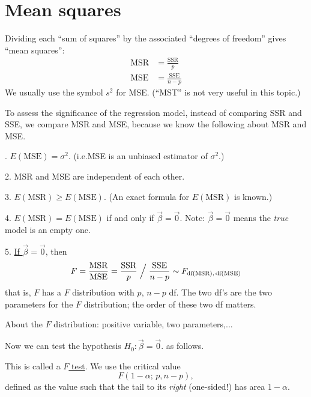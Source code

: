 \documentclass[12pt]{article}
\newcommand\SSE{\text{SSE}}
\newcommand\SSR{\text{SSR}}
\begin{document}
\section{Mean squares}

Dividing each ``sum of squares'' by the associated
``degrees of freedom'' gives ``mean squares'':
\[\begin{split}
\text{MSR} &= \frac{\text{SSR}}{p}
\\
\text{MSE} &= \frac{\text{SSE}}{n - p}
\end{split}\]
We usually use the symbol $s^2$ for MSE.
(``MST'' is not very useful in this topic.)

To assess the significance of the regression model,
instead of comparing SSR and SSE,
we compare MSR and MSE,
because we know the following about MSR and MSE.

. $E(\text{MSE}) = \sigma^2$.
(i.e.\@ MSE is an unbiased estimator of $\sigma^2$.)
\par
2. MSR and MSE are independent of each other.
\par
3. $E(\text{MSR}) \ge E(\text{MSE})$.
(An exact formula for $E(\text{MSR})$ is known.)
\par
4. $E(\text{MSR}) = E(\text{MSE})$
if and only if $\vec{\beta} = \vec{0}$.
Note: $\vec\beta = \vec{0}$ means the \emph{true} model is an empty one.
\par
5. \underline{If $\vec{\beta} = \vec{0}$}, then
\[
F = \frac{\text{MSR}}{\text{MSE}}
  = \frac{\SSR}{p} \Bigm/ \frac{\SSE}{n-p}
  \sim F_{\text{df}(\text{MSR}),\,
          \text{df}(\text{MSE})}
\]
that is,
$F$ has a $F$ distribution with
$p$, $n-p$ df.
The two df's are the two parameters for the $F$ distribution;
the order of these two df matters.


\bigskip
About the $F$ distribution:
positive variable, two parameters,...
\bigskip

Now we can test the hypothesis $H_0: \vec\beta = \vec{0}$.
as follows.


This is called a \underline{$F$ test}.
We use the critical value
\[
F(1-\alpha;\, p, n-p)
,
\]
defined as the value such that
the tail to its \emph{right} (one-sided!) has area $1-\alpha$.
\end{document}

